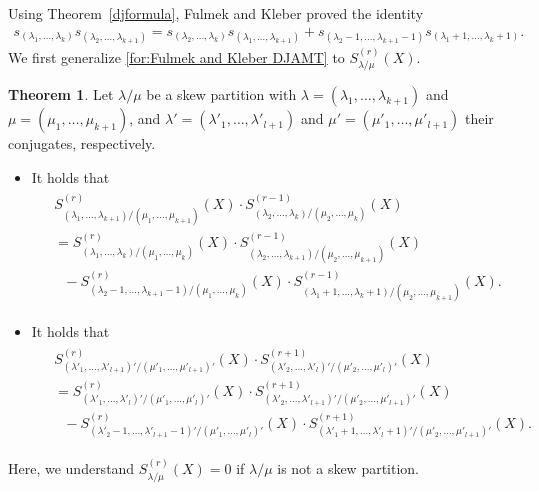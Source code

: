 \documentclass[12pt]{amsart}%
\theoremstyle{definition}
\newtheorem{theorem}{Theorem}[section]
\begin{document}
Using Theorem~\ref{djformula}, 
Fulmek and Kleber \cite[Theorem 2]{fk} proved the identity 
\begin{align}
\label{for:Fulmek and Kleber DJAMT}
s_{(\lambda_1,\ldots,\lambda_{k})}s_{(\lambda_2,\ldots,\lambda_{k+1})}
=s_{(\lambda_2,\ldots,\lambda_{k})}s_{(\lambda_1,\ldots,\lambda_{k+1})}
+s_{(\lambda_2-1,\ldots,\lambda_{k+1}-1)}s_{(\lambda_1+1,\ldots,\lambda_{k}+1)}.
\end{align}
We first generalize \eqref{for:Fulmek and Kleber DJAMT} to $S^{(r)}_{\lambda/\mu}(X)$.

\begin{theorem}
\label{fk9th}
Let $\lambda/\mu$ be a skew partition with 
$\lambda=(\lambda_1,\ldots,\lambda_{k+1})$ and 
$\mu=(\mu_1,\ldots,\mu_{k+1})$,
and $\lambda'=(\lambda'_1,\ldots,\lambda'_{l+1})$ and 
$\mu'=(\mu'_1,\ldots,\mu'_{l+1})$ their conjugates, respectively.
\begin{itemize}
\item[(1)] 
 It holds that 
\begin{align}
\label{for:DJAMT H}
\begin{split}
& 
S_{(\lambda_1,\ldots,\lambda_{k+1})/(\mu_1,\ldots,\mu_{k+1})}^{(r)}(X)
\cdot S_{(\lambda_2,\ldots,\lambda_{k})/(\mu_2,\ldots,\mu_{k})}^{(r-1)}(X)
\\
&=S_{(\lambda_1,\ldots,\lambda_{k})/(\mu_1,\ldots,\mu_{k})}^{(r)}(X)
\cdot S_{(\lambda_2,\ldots,\lambda_{k+1})/(\mu_2,\ldots,\mu_{k+1})}^{(r-1)}(X)
\\
&\ \ \ 
-S_{(\lambda_2-1,\ldots,\lambda_{k+1}-1)/(\mu_1,\ldots,\mu_{k})}^{(r)}(X)
\cdot S_{(\lambda_1+1,\ldots,\lambda_{k}+1)/(\mu_2,\ldots,\mu_{k+1})}^{(r-1)}(X).
\end{split}
\end{align}
\item[(2)]  
 It holds that 
\begin{align}
\label{for:DJAMT E}
\begin{split}
& 
S_{(\lambda'_1,\ldots,\lambda'_{l+1})'/(\mu'_1,\ldots,\mu'_{l+1})'}^{(r)}(X)
 \cdot S_{(\lambda'_2,\ldots,\lambda'_{l})'/(\mu'_2,\ldots,\mu'_{l})'}^{(r+1)}(X)
\\
&=S_{(\lambda'_1,\ldots,\lambda'_{l})'/(\mu'_1,\ldots,\mu'_{l})'}^{(r)}(X)
 \cdot S_{(\lambda'_2,\ldots,\lambda'_{l+1})'/(\mu'_2,\ldots,\mu'_{l+1})'}^{(r+1)}(X)\\
&\ \ \ 
-S_{(\lambda'_2-1,\ldots,\lambda'_{l+1}-1)'/(\mu'_1,\ldots,\mu'_{l})'}^{(r)}(X)
 \cdot  S_{(\lambda'_1+1,\ldots,\lambda'_{l}+1)'/(\mu'_2,\ldots,\mu'_{l+1})'}^{(r+1)}(X).
 \end{split}
\end{align}
\end{itemize}
Here, we understand $S^{(r)}_{\lambda/\mu}(X)=0$
if $\lambda/\mu$ is not a skew partition.
\end{theorem}
\end{document}
